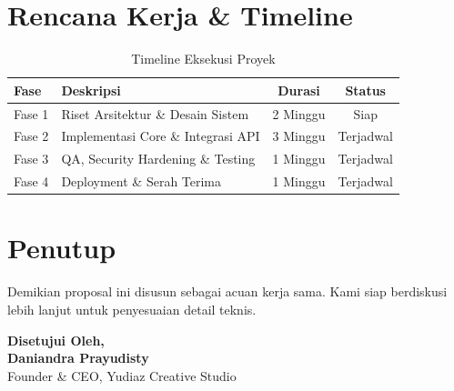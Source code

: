 \documentclass[11pt,a4paper]{article}
\begin{document}
\section{Rencana Kerja \& Timeline}
\begin{table}[h!]
\centering
\begin{tabular}{@{}llcc@{}}
\toprule
\textbf{Fase} & \textbf{Deskripsi} & \textbf{Durasi} & \textbf{Status} \\ \midrule
Fase 1 & Riset Arsitektur \& Desain Sistem & 2 Minggu & Siap \\
Fase 2 & Implementasi Core \& Integrasi API & 3 Minggu & Terjadwal \\
Fase 3 & QA, Security Hardening \& Testing & 1 Minggu & Terjadwal \\
Fase 4 & Deployment \& Serah Terima & 1 Minggu & Terjadwal \\ \bottomrule
\end{tabular}
\caption{Timeline Eksekusi Proyek}
\end{table}

\section{Penutup}
Demikian proposal ini disusun sebagai acuan kerja sama. Kami siap berdiskusi lebih lanjut untuk penyesuaian detail teknis.

\vspace{1.5cm}
\noindent
\textbf{Disetujui Oleh,}\\[1.5cm]
\textbf{Daniandra Prayudisty}\\
Founder \& CEO, Yudiaz Creative Studio
\end{document}
